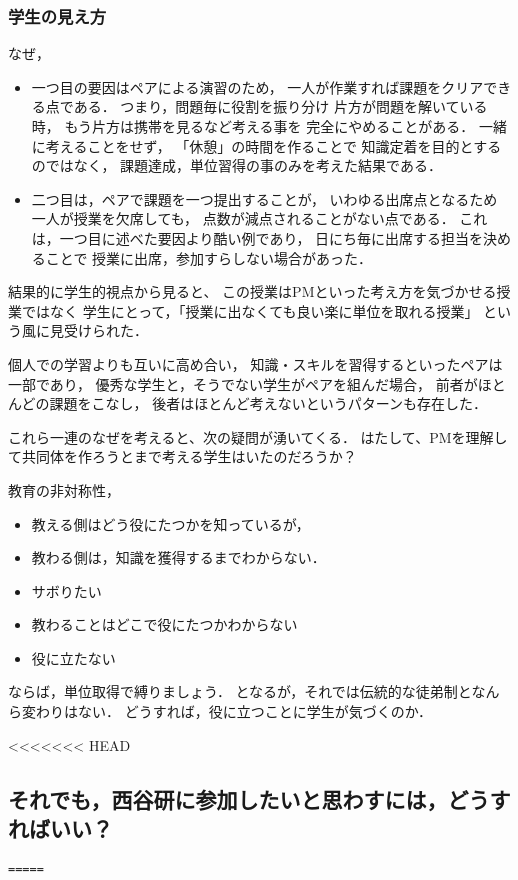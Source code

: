 \documentclass{hissymp}
\begin{document}
\subsubsection{学生の見え方}
\label{sec:org5740900}
なぜ，
\begin{itemize}
\item 一つ目の要因はペアによる演習のため，
一人が作業すれば課題をクリアできる点である．
つまり，問題毎に役割を振り分け
片方が問題を解いている時，
もう片方は携帯を見るなど考える事を
完全にやめることがある．
一緒に考えることをせず，
「休憩」の時間を作ることで
知識定着を目的とするのではなく，
課題達成，単位習得の事のみを考えた結果である．

\item 二つ目は，ペアで課題を一つ提出することが，
いわゆる出席点となるため
一人が授業を欠席しても，
点数が減点されることがない点である．
これは，一つ目に述べた要因より酷い例であり，
日にち毎に出席する担当を決めることで
授業に出席，参加すらしない場合があった．
\end{itemize}

結果的に学生的視点から見ると、
この授業はPMといった考え方を気づかせる授業ではなく
学生にとって，「授業に出なくても良い楽に単位を取れる授業」
という風に見受けられた．

個人での学習よりも互いに高め合い，
知識・スキルを習得するといったペアは一部であり，
優秀な学生と，そうでない学生がペアを組んだ場合，
前者がほとんどの課題をこなし，
後者はほとんど考えないというパターンも存在した．

これら一連のなぜを考えると、次の疑問が湧いてくる．
はたして、PMを理解して共同体を作ろうとまで考える学生はいたのだろうか？

教育の非対称性，
\begin{itemize}
\item 教える側はどう役にたつかを知っているが，
\item 教わる側は，知識を獲得するまでわからない．

\item サボりたい
\item 教わることはどこで役にたつかわからない
\item 役に立たない
\end{itemize}

ならば，単位取得で縛りましょう．
となるが，それでは伝統的な徒弟制となんら変わりはない．
どうすれば，役に立つことに学生が気づくのか．

<<<<<<< HEAD
\subsection{それでも，西谷研に参加したいと思わすには，どうすればいい？}
\label{sec:orgdca9f60}
\texttt{=====}
\end{document}

